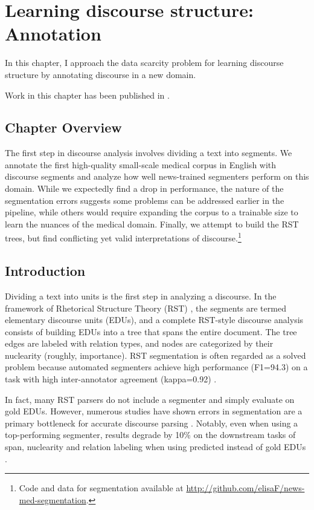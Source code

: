 \chapter{Learning discourse structure: Annotation}
\label{ch:annotation}
In this chapter, I approach the data scarcity problem for learning discourse structure by annotating discourse in a new domain.

Work in this chapter has been published in .

\section{Chapter Overview}

The first step in discourse analysis involves dividing a text into segments. We annotate the first high-quality small-scale medical corpus in English with discourse segments and analyze how well news-trained segmenters perform on this domain. While we expectedly find a drop in performance, the nature of the segmentation errors suggests some problems can be addressed earlier in the pipeline, while others would require expanding the corpus to a trainable size to learn the nuances of the medical domain. Finally, we attempt to build the RST trees, but find conflicting yet valid interpretations of discourse.\footnote{Code and data for segmentation available at \url{http://github.com/elisaF/news-med-segmentation}.}

\section{Introduction}

Dividing a text into units is the first step in analyzing a discourse. In the framework of Rhetorical Structure Theory (RST) \cite{Mann:1988}, the segments are termed elementary discourse units (EDUs), and a complete RST-style discourse analysis consists of building EDUs into a tree that spans the entire document. The tree edges are labeled with relation types, and nodes are categorized by their nuclearity (roughly, importance). RST segmentation is often regarded as a solved problem because automated segmenters achieve high performance (F1=94.3) on a task with high inter-annotator agreement (kappa=0.92) \cite{Wang:2018,Carlson:2001}.

In fact, many RST parsers do not include a segmenter and simply evaluate on gold EDUs. However, numerous studies have shown errors in segmentation are a primary bottleneck for accurate discourse parsing \cite{Soricut:2003,Fisher:2007,Joty:2015,Feng:2015}. Notably, even when using a top-performing segmenter, results degrade by 10\% on the downstream tasks of span, nuclearity and relation labeling when using predicted instead of gold EDUs \cite{Feng:2015}.

